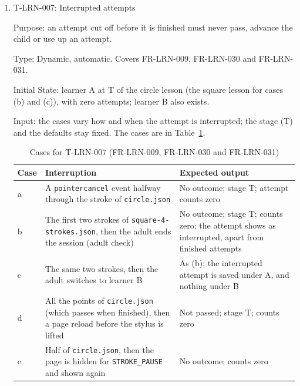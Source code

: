 \documentclass[12pt, titlepage]{article}
\newcommand{\testitem}[1]{\item #1\par\nopagebreak}
\begin{document}
\begin{enumerate}
Test Case Derivation: the fit criterion (``one attempt is evaluated against
the complete figure, not two''). In SRS Section~9.2, a lift closes a
stroke, not the attempt. (c) is the H-AHM-001 cause in which ``a stylus
lift is mistaken for the end of an attempt''. (c) also checks that the
strokes are evaluated at the first lift (the fit criterion of FR-LRN-038). (d) is the fit criterion of FR-LRN-039, a
passing figure ends at its last lift. (e) to (g) are that of FR-LRN-024: a
missing part gets a hint before the attempt ends, a second hint needs a new
stroke, and no attempt gets more than \texttt{MAX\_HINTS}.

How test will be performed: Playwright counts the attempt records and the
evaluation results.

\testitem{T-LRN-007: Interrupted attempts}

Purpose: an attempt cut off before it is finished must never pass, advance
the child or use up an attempt.

Type: Dynamic, automatic. Covers FR-LRN-009, FR-LRN-030 and FR-LRN-031.

Initial State: learner A at T of the circle lesson (the square lesson for
cases (b) and (c)), with zero attempts; learner B also exists.

Input: the cases vary how and when the attempt is interrupted; the stage
(T) and the defaults stay fixed. The cases are in
Table~\ref{tab:t-lrn-007}.

\begin{table}[htbp]
\centering\small
\caption{Cases for T-LRN-007 (FR-LRN-009, FR-LRN-030 and FR-LRN-031)}
\label{tab:t-lrn-007}
\begin{tabularx}{\textwidth}{@{}l >{\raggedright\arraybackslash}X
  >{\raggedright\arraybackslash}X@{}}
\toprule
\textbf{Case} & \textbf{Interruption} & \textbf{Expected output}\\
\midrule
a & A \texttt{pointercancel} event halfway through the stroke of
\texttt{circle.json} & No outcome; stage T; attempt counts zero\\
b & The first two strokes of
\texttt{square-\allowbreak{}4-\allowbreak{}strokes.json}, then the adult
ends the session (adult check) & No outcome; stage T; counts zero; the
attempt shows as interrupted, apart from finished attempts\\
c & The same two strokes, then the adult switches to learner B & As (b);
the interrupted attempt is saved under A, and nothing under B\\
d & All the points of \texttt{circle.json} (which passes when finished),
then a page reload before the stylus is lifted & Not passed; stage T; counts
zero\\
e & Half of \texttt{circle.json}, then the page is hidden for
\texttt{STROKE\_PAUSE} and shown again & No outcome; counts zero\\
\bottomrule
\end{tabularx}
\end{table}


\end{enumerate}
\end{document}
